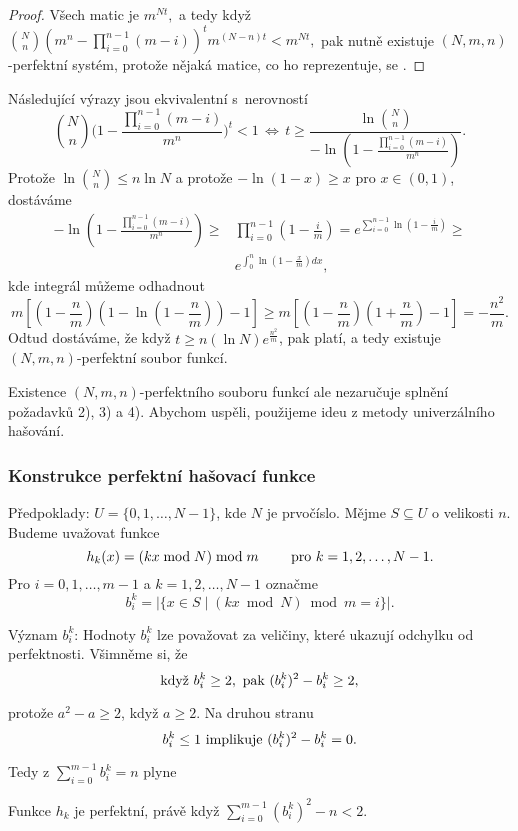 \documentclass[a4paper,12pt]{article}
\begin{document}
\begin{proof}
Všech matic je $m^{Nt},$ a tedy  když $\binom Nn(m^n-\prod_{i=0}^{n-1}(m-i))^tm^{(N-n)t}<m^{Nt},$ pak nutně existuje $(N,m,n)$-perfektní systém, protože nějaká matice, co ho reprezentuje, se .
\end{proof}


Následující vý\-ra\-zy jsou ekvivalentní s~ne\-rov\-ností 
\thetag{$*$}
$$\binom Nn\big(1-\frac {\prod_{i=0}^{n-1}(m-i)}{m^n}\big)^t<1\,\Leftrightarrow\,
t\ge\frac {\ln\binom Nn}{-\ln(1-\frac {\prod_{i=0}^{n-1}(m-i)}{m^
n})}.$$
Protože $\ln\binom Nn\le n\ln N$ a protože $-\ln(1-x)\ge x$ pro $
x\in (0,1)$, dostáváme
\begin{align*}-\ln(1-\frac {\prod_{i=0}^{n-1}(m-i)}{m^n})\ge&\prod_{i=0}^{
n-1}(1-\frac im)=e^{\sum_{i=0}^{n-1}\ln(1-\frac im)}\ge\\
&e^{\int_0^n\ln(1-\frac xm)dx},\end{align*}
kde integrál můžeme odhadnout 
$$m[(1-\frac nm)(1-\ln(1-\frac nm))-1]\ge m[(1-\frac nm)(1+\frac 
nm)-1]=-\frac {n^2}m.$$
Odtud dostáváme, že když $t\ge n(\ln N)e^{\frac {n^2}m}$, pak \thetag{*} platí, a tedy 
existuje $(N,m,n)$-perfektní soubor funkcí. 

Existence $(N,m,n)$-perfektního souboru funkcí ale 
nezaručuje splnění požadavků 2), 3) a 4).  
Abychom uspěli, použijeme ideu z metody univerzálního 
hašování.  

\subsubsection{Konstrukce perfektní hašovací funkce}

Předpoklady:  $U=\{0,1,\dots,N-1\}$, kde $N$ je 
prvočíslo.  Mějme $S\subseteq U$ o velikosti $n$.  Budeme 
uvažovat funkce 
$$h_k(x)=(kx\bmod N)\bmod m\qquad\text{\rm\ pro }k=1,2,\dots,N-1.$$
Pro $i=0,1,\dots,m-1$ a $k=1,2,\dots,N-1$ označme 
$$b_i^k=|\{x\in S\mid (kx\bmod N)\bmod m=i\}|.$$

Význam $b_i^k$: Hodnoty $b_i^k$ lze považovat za 
veličiny, které ukazují odchylku od perfektnosti. 
Všimněme si, že 
$$\text{\rm když }b_i^k\ge 2,\text{\rm\ pak }(b_i^k)^2-b_i^k\ge 
2,$$

protože $a^2-a\ge 2$, když $a\ge 2$. Na druhou stranu 
$$b_i^k\le 1\text{\rm\ implikuje }(b_i^k)^2-b_i^k=0.$$

Tedy z $\sum_{i=0}^{m-1}b_i^k=n$ plyne 

\begin{veta}Funkce $h_k$ je perfektní, právě když 
$\sum_{i=0}^{m-1}(b_i^k)^2-n<2$.
\end{veta}
\end{document}
